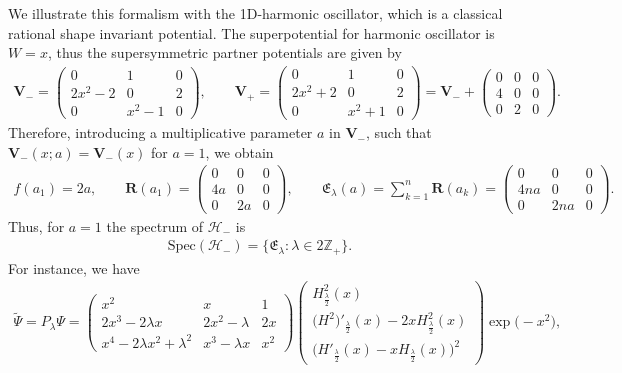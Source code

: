 \documentclass[10pt,a4paper]{amsart}
\numberwithin{equation}{section}
\begin{document}
We illustrate this formalism with the 1D-harmonic oscillator, which is a classical rational shape invariant potential. The superpotential for harmonic oscillator is $W=x$, thus the supersymmetric partner potentials are given by
\begin{gather*}
\mathbf{V}_-=\begin{pmatrix}0&1&0\\2x^2- 2&0&2\\0&x^2-1&0\end{pmatrix}\!, \qquad \mathbf{V}_+=\begin{pmatrix}0&1&0\\2x^2+2&0&2\\0&x^2+1&0\end{pmatrix}
=\mathbf{V}_-+\begin{pmatrix}0&0&0\\4&0&0\\0&2&0\end{pmatrix}\!.
\end{gather*}
Therefore, introducing a multiplicative parameter $a$ in $\mathbf{V}_-$, such that $\mathbf{V}_-(x;a)=\mathbf{V}_-(x)$ for $a=1$, we obtain
\begin{gather*}
f(a_1)=2a,\qquad \mathbf{R}(a_1)=\begin{pmatrix}0&0&0\\4a&0&0\\0&2a&0\end{pmatrix}\!,\qquad \mathfrak{E}_{\lambda} (a) = \sum_{k=1}^n \mathbf{R}(a_k)=\begin{pmatrix}0&0&0\\4na&0&0\\0&2na&0\end{pmatrix}\!.
\end{gather*}
Thus, for $a=1$ the spectrum of $\mathcal H_-$ is
\begin{gather*}
\mathrm{Spec}(\mathcal H_-)=\{\mathfrak E_\lambda\colon\lambda\in 2\mathbb{Z}_+\}.
\end{gather*}
For instance, we have
\begin{gather*}
\widetilde{\Psi}=P_\lambda\Psi=\begin{pmatrix}
x^2&x&1\\2x^3-2\lambda x&2x^2-\lambda&2x\\x^4-2\lambda x^2+\lambda^2&x^3-\lambda x&x^2
\end{pmatrix}\begin{pmatrix}
H^2_{\frac{\lambda}{2}}(x)
\\
\big(H^2\big)'_{\frac{\lambda}{2}}(x)-2xH^2_{\frac{\lambda}{2}}(x)
\\
\big(H'_{\frac{\lambda}{2}}(x)-xH_{\frac{\lambda}{2}}(x)\big)^2
\end{pmatrix}\exp\bigl(-x^2\bigr),
\end{gather*}
\end{document}
